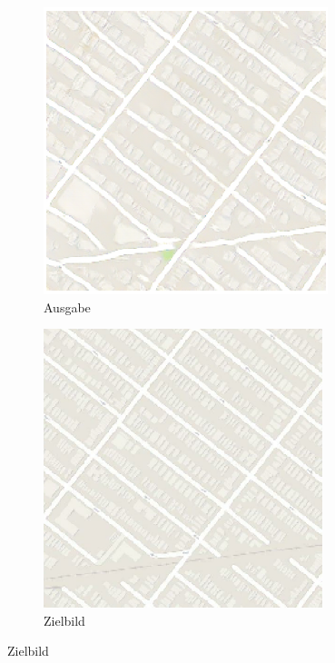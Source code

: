 \begin{figure}[ht]
\begin{subfigure}[t]{.14\textwidth}
	\end{subfigure}
	\begin{subfigure}[t]{.14\textwidth}
		\centering
		\caption*{Ausgabe}
		\includegraphics[width=\linewidth]{images/Pix2PixResults/Generiertes-Bild2.png}
	\end{subfigure}
	\begin{subfigure}[t]{.14\textwidth}
		\centering
		\caption*{Zielbild}
		\includegraphics[width=\linewidth]{images/Pix2PixResults/Ziel-Bild2.png}
	\end{subfigure}
	\label{fig:StreePic}
\end{figure}

